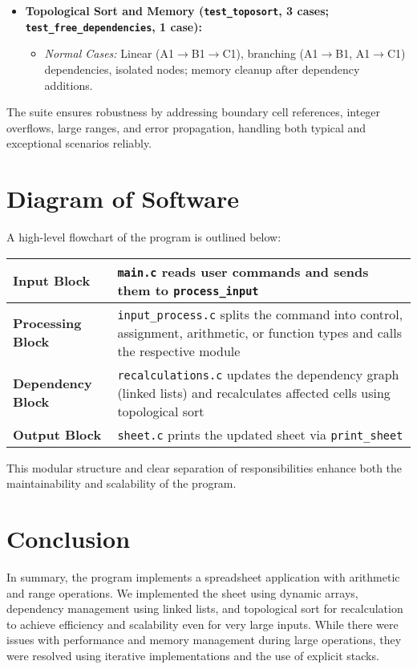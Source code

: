 \documentclass[12pt,letterpaper,onecolumn]{exam}
\begin{document}
\begin{itemize}
    \item \textbf{Topological Sort and Memory (\texttt{test\_toposort}, 3 cases; \texttt{test\_free\_dependencies}, 1 case):}
    \begin{itemize}
        \item \textit{Normal Cases:} Linear (A1$\rightarrow$B1$\rightarrow$C1), branching (A1$\rightarrow$B1, A1$\rightarrow$C1) dependencies, isolated nodes; memory cleanup after dependency additions.
    \end{itemize}
\end{itemize}

The suite ensures robustness by addressing boundary cell references, integer overflows, large ranges, and error propagation, handling both typical and exceptional scenarios reliably.
\section{Diagram of Software}

A high-level flowchart of the program is outlined below:

\begin{center}
\begin{tabularx}{\textwidth}{|X|X|}
    \hline
    \textbf{Input Block} & \texttt{main.c} reads user commands and sends them to \texttt{process\_input} \\
    \hline
    \textbf{Processing Block} & \texttt{input\_process.c} splits the command into control, assignment, arithmetic, or function types and calls the respective module \\
    \hline
    \textbf{Dependency Block} & \texttt{recalculations.c} updates the dependency graph (linked lists) and recalculates affected cells using topological sort \\
    \hline
    \textbf{Output Block} & \texttt{sheet.c} prints the updated sheet via \texttt{print\_sheet} \\
    \hline
\end{tabularx}
\end{center}

This modular structure and clear separation of responsibilities enhance both the maintainability and scalability of the program.

\section{Conclusion}

In summary, the program implements a spreadsheet application with arithmetic and range operations. We implemented the sheet using dynamic arrays, dependency management using linked lists, and topological sort for recalculation to achieve efficiency and scalability even for very large inputs. While there were issues with performance and memory management during large operations, they were resolved using iterative implementations and the use of explicit stacks.

\pagestyle{plain}
\end{document}
